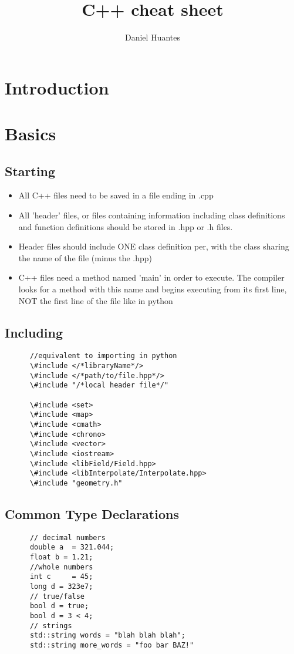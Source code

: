\documentclass[12pt]{article}
\begin{document}
\title{C++ cheat sheet}
\author{Daniel Huantes}
\maketitle
\section{Introduction}

\section{Basics}
  \subsection{Starting}
    \begin{itemize}
      \item All C++ files need to be saved in a file ending in .cpp
      \item All 'header' files, or files containing information
      including class definitions and function definitions should be
      stored in .hpp or .h files.
      \item Header files should include ONE class definition per, with
      the class sharing the name of the file (minus the .hpp)
      \item C++ files need a method named 'main' in order to
      execute. The compiler looks for a method with this name and
      begins executing from its first line, NOT the first line of the
      file like in python
    \end{itemize}
  \subsection{Including}
    \begin{lstlisting}
      //equivalent to importing in python
      \#include </*libraryName*/>
      \#include </*path/to/file.hpp*/>
      \#include "/*local header file*/"

      \#include <set>
      \#include <map>
      \#include <cmath>
      \#include <chrono>
      \#include <vector>
      \#include <iostream>
      \#include <libField/Field.hpp>
      \#include <libInterpolate/Interpolate.hpp>
      \#include "geometry.h"

    \end{lstlisting}
  \subsection{Common Type Declarations}
    \begin{lstlisting}
      // decimal numbers
      double a  = 321.044; 
      float b = 1.21;
      //whole numbers
      int c     = 45;
      long d = 323e7;  
      // true/false
      bool d = true;
      bool d = 3 < 4;
      // strings
      std::string words = "blah blah blah";
      std::string more_words = "foo bar BAZ!"
    \end{lstlisting}
\end{document}
